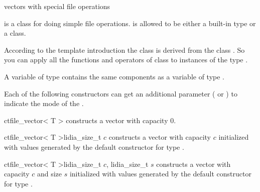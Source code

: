 

\NAME

 \dotfill vectors with special file operations



\ABSTRACT

 is a class for doing simple file operations.   is allowed to be
either a built-in type or a class.

According to the template introduction the class  is derived from the
class .  So you can apply all the functions and operators of class
 to instances of the type .



\DESCRIPTION

A variable of type  contains the same components as a variable of type
.



\CONS

Each of the following constructors can get an additional parameter
( or ) to indicate the mode of the .

\begin{fcode}{ct}{file_vector< T >}{}
  constructs a vector with capacity 0.
\end{fcode}

\begin{fcode}{ct}{file_vector< T >}{lidia_size_t $c$}
  constructs a vector with capacity $c$ initialized with values generated by the default
  constructor for type .
\end{fcode}

\begin{fcode}{ct}{file_vector< T >}{lidia_size_t $c$, lidia_size_t $s$}
  constructs a vector with capacity $c$ and size $s$ initialized with values generated by the
  default constructor for type .
\end{fcode}

